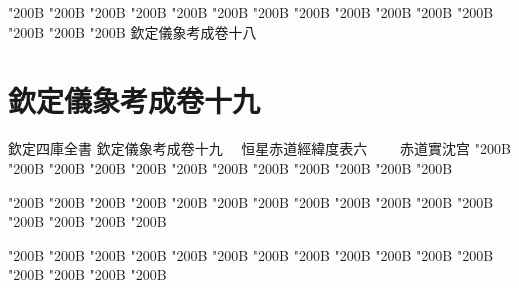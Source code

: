 \begin{正文}
\char"200B\relax{}
\char"200B\relax{}
\char"200B\relax{}
\char"200B\relax{}
\char"200B\relax{}
\char"200B\relax{}
\char"200B\relax{}
\char"200B\relax{}
\char"200B\relax{}
\char"200B\relax{}
\char"200B\relax{}
\char"200B\relax{}
\char"200B\relax{}
\char"200B\relax{}
\char"200B\relax{}
欽定儀象考成卷十八
\par

\par\end{正文}\clearpage
\chapter*{欽定儀象考成卷十九}
\begin{正文}
欽定四庫全書
欽定儀象考成卷十九
　恒星赤道經緯度表六
　　赤道實沈宫
\char"200B\relax{}
\char"200B\relax{}
\char"200B\relax{}
\char"200B\relax{}
\char"200B\relax{}
\char"200B\relax{}
\char"200B\relax{}
\char"200B\relax{}
\char"200B\relax{}
\char"200B\relax{}
\char"200B\relax{}
\char"200B\relax
\par
\end{正文}\clearpage
{}
\begin{正文}
\char"200B\relax{}
\char"200B\relax{}
\char"200B\relax{}
\char"200B\relax{}
\char"200B\relax{}
\char"200B\relax{}
\char"200B\relax{}
\char"200B\relax{}
\char"200B\relax{}
\char"200B\relax{}
\char"200B\relax{}
\char"200B\relax{}
\char"200B\relax{}
\char"200B\relax{}
\char"200B\relax{}
\char"200B\relax
{}\par
\end{正文}\clearpage
{}
\begin{正文}
\char"200B\relax{}
\char"200B\relax{}
\char"200B\relax{}
\char"200B\relax{}
\char"200B\relax{}
\char"200B\relax{}
\char"200B\relax{}
\char"200B\relax{}
\char"200B\relax{}
\char"200B\relax{}
\char"200B\relax{}
\char"200B\relax{}
\char"200B\relax{}
\char"200B\relax{}
\char"200B\relax{}
\char"200B\relax
{}\par
\end{正文}\clearpage
